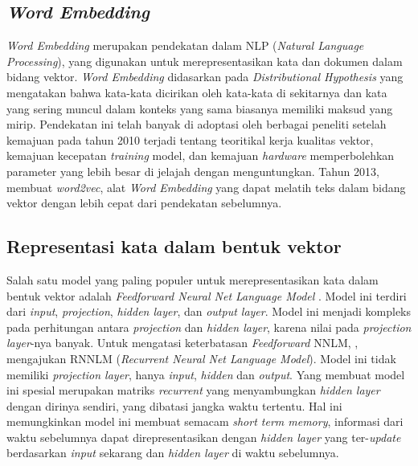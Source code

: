\documentclass[12pt]{report}
\begin{document}
\subsection{\textit{Word Embedding}}
\textit{Word Embedding} merupakan pendekatan dalam NLP (\textit{Natural Language Processing}), yang digunakan untuk merepresentasikan kata dan dokumen dalam bidang vektor. \textit{Word Embedding} didasarkan pada \textit{Distributional Hypothesis} yang mengatakan bahwa kata-kata dicirikan oleh kata-kata di sekitarnya dan kata yang sering muncul dalam konteks yang sama biasanya memiliki maksud yang mirip. Pendekatan ini  telah banyak di adoptasi oleh berbagai peneliti setelah kemajuan pada tahun 2010 terjadi tentang teoritikal kerja kualitas vektor, kemajuan kecepatan \textit{training} model, dan kemajuan \textit{hardware} memperbolehkan parameter yang lebih besar di jelajah dengan menguntungkan. Tahun 2013,  membuat \textit{word2vec}, alat \textit{Word Embedding} yang dapat melatih teks dalam bidang vektor dengan lebih cepat dari pendekatan sebelumnya.


\subsection{Representasi kata dalam bentuk vektor}

Salah satu model yang paling populer untuk merepresentasikan kata dalam bentuk vektor adalah \textit{Feedforward Neural Net Language Model} . Model ini terdiri dari \textit{input}, \textit{projection}, \textit{hidden layer}, dan \textit{output layer}. Model ini menjadi kompleks pada perhitungan antara \textit{projection} dan \textit{hidden layer}, karena nilai pada \textit{projection layer}-nya banyak. Untuk mengatasi keterbatasan \textit{Feedforward} NNLM, , mengajukan RNNLM (\textit{Recurrent Neural Net Language Model}). Model ini tidak memiliki \textit{projection layer}, hanya \textit{input}, \textit{hidden} dan \textit{output}. Yang membuat model ini spesial merupakan matriks \textit{recurrent} yang menyambungkan \textit{hidden layer} dengan dirinya sendiri, yang dibatasi jangka waktu tertentu. Hal ini memungkinkan model ini membuat semacam \textit{short term memory}, informasi dari waktu sebelumnya dapat direpresentasikan dengan \textit{hidden layer} yang ter-\textit{update} berdasarkan \textit{input} sekarang dan \textit{hidden layer} di waktu sebelumnya. 
\end{document}

